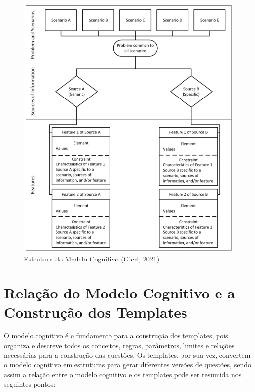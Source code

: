 \begin{figure}[ht]
	\centering
	\includegraphics[width=14cm]{./imagens/capitulo4/cognitive-model}
	\caption{Estrutura do Modelo Cognitivo (Gierl, 2021)}
	\label{fig:cognitive-model}
\end{figure}


\section{Relação do Modelo Cognitivo e a Construção dos Templates }

O modelo cognitivo é o fundamento para a construção dos templates, pois organiza e descreve todos os conceitos, regras, parâmetros, limites e relações necessárias para a construção das questões. Os templates, por sua vez, convertem o modelo cognitivo em estruturas para gerar diferentes versões de questões, sendo assim a relação entre o modelo cognitivo e os templates pode ser resumida nos seguintes pontos:


